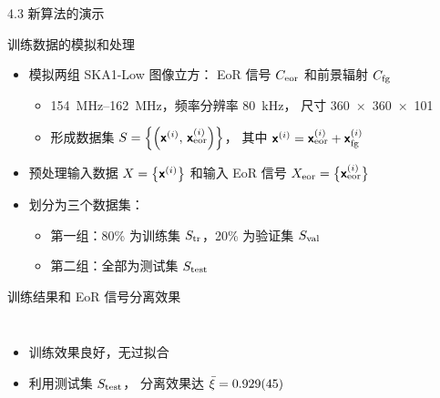 \documentclass{beamer}
\begin{document}
\begin{frame}{4.3 新算法的演示}
  \begin{alertblock}{训练数据的模拟和处理}
  \end{alertblock}
  \begin{itemize}
    \item 模拟两组 SKA1-Low 图像立方：
      EoR 信号 $C_{\text{eor}}$ 和前景辐射 $C_{\text{fg}}$
      \begin{itemize}
        \item \SIrange{154}{162}{\MHz}，频率分辨率 \SI{80}{\kHz}，
          尺寸 \num{360 x 360 x 101}
        \item 形成数据集 $S = \left\{ \left(\bm{\mathsf{x}}^{(i)},
          \,\bm{\mathsf{x}}^{(i)}_{\text{eor}} \right) \right\}$，
          其中 $\bm{\mathsf{x}}^{(i)} = \bm{\mathsf{x}}^{(i)}_{\text{eor}} + \bm{\mathsf{x}}^{(i)}_{\text{fg}}$
      \end{itemize}
    \item 预处理输入数据 $X = \big\{ \bm{\mathsf{x}}^{(i)} \big\}$
      和输入 EoR 信号 $X_{\text{eor}} = \big\{ \bm{\mathsf{x}}^{(i)}_{\text{eor}} \big\}$
    \item 划分为三个数据集：
      \begin{itemize}
        \item 第一组：80\% 为训练集 $S_{\text{tr}}$，20\% 为验证集 $S_{\text{val}}$
        \item 第二组：全部为测试集 $S_{\text{test}}$
      \end{itemize}
  \end{itemize}
\end{frame}

\begin{frame}[t]
  \begin{alertblock}{训练结果和 EoR 信号分离效果}
  \end{alertblock}
  \begin{columns}
    \begin{itemize}
      \item 训练效果良好，无过拟合
      \item 利用测试集 $S_{\text{test}}$，
        分离效果达 $\bar{\xi} = \num{0.929 +- 0.045}$
    \end{itemize}
    \vspace{-1ex}

  \end{columns}
\end{frame}
\end{document}
